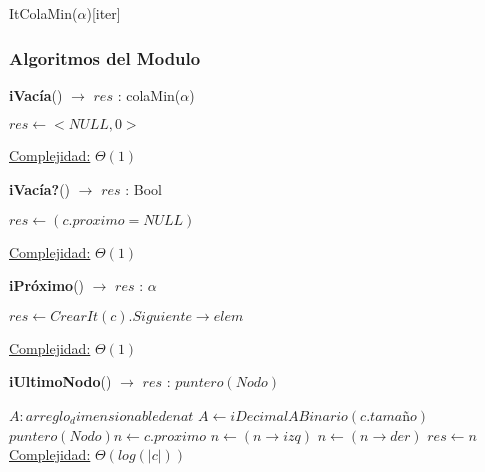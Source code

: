 \begin{Estructura}{ItColaMin($\alpha$)}[iter]
\subsubsection{Algoritmos del Modulo}

\begin{algorithm}[H]{\textbf{iVacía}() $\to$ $res$ : colaMin($\alpha$)}
    	\begin{algorithmic}[1]
			\State $res \gets <NULL, 0>$ 
			
			\medskip
			\Statex \underline{Complejidad:} $\Theta(1)$
    	\end{algorithmic}
\end{algorithm}

\begin{algorithm}[H]{\textbf{iVacía?}() $\to$ $res$ : Bool}
    	\begin{algorithmic}[1]
			\State $res \gets (c.proximo = NULL)$ 
			
			\medskip
			\Statex \underline{Complejidad:} $\Theta(1)$
    	\end{algorithmic}
\end{algorithm}

\begin{algorithm}[H]{\textbf{iPróximo}() $\to$ $res$ : $\alpha$}
    	\begin{algorithmic}[1]
			\State $res \gets CrearIt(c).Siguiente \rightarrow elem$ 
			
			\medskip
			\Statex \underline{Complejidad:} $\Theta(1)$
    	\end{algorithmic}
\end{algorithm}

\begin{algorithm}[H]{\textbf{iUltimoNodo}() $\to$ $res$ : $puntero(Nodo)$}
    	\begin{algorithmic}[1]
	    	\State $A: arreglo_dimensionable de nat$ 
			\State $A \leftarrow iDecimalABinario(c.tamaño) $ 
			\State $puntero(Nodo) n \gets c.proximo$ 
			 
					\State $n \gets (n \rightarrow izq)$ 
				\Else
					\State $n \gets (n \rightarrow der)$ 
				\EndIf
			\EndFor
			\State $res \gets n $
    	\medskip
		\Statex \underline{Complejidad:} $\Theta(log(|c|))$
    	\end{algorithmic}
\end{algorithm}


\end{Estructura}
